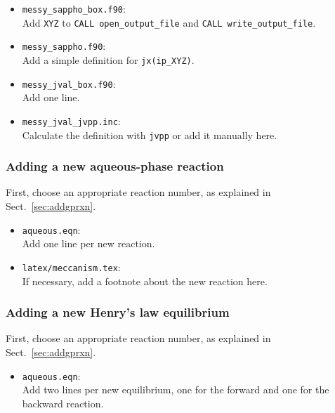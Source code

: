 \documentclass[twoside]{article}
\def\nosep{\setlength\parsep{0mm}\setlength\topsep{0mm}\setlength\itemsep{0mm}}
\begin{document}
\begin{itemize}\nosep
\item \verb|messy_sappho_box.f90|:\\
  Add \verb|XYZ| to \verb|CALL open_output_file| and
  \verb|CALL write_output_file|.
\item \verb|messy_sappho.f90|:\\
  Add a simple definition for \verb|jx(ip_XYZ)|.
\end{itemize}

\begin{itemize}\nosep
\item \verb|messy_jval_box.f90|:\\
  Add one line.
\item \verb|messy_jval_jvpp.inc|:\\
  Calculate the definition with \verb|jvpp| or add it manually here.
\end{itemize}

\subsubsection{Adding a new aqueous-phase reaction}

First, choose an appropriate reaction number, as explained in
Sect.~\ref{sec:addgprxn}.

\begin{itemize}\nosep
\item \verb|aqueous.eqn|:\\
  Add one line per new reaction.
\end{itemize}

\begin{itemize}\nosep
\item \verb|latex/meccanism.tex|:\\
  If necessary, add a footnote about the new reaction here.
\end{itemize}

\subsubsection{Adding a new Henry's law equilibrium}

First, choose an appropriate reaction number, as explained in
Sect.~\ref{sec:addgprxn}.

\begin{itemize}\nosep
\item \verb|aqueous.eqn|:\\
  Add two lines per new equilibrium, one for the forward and one for the
  backward reaction.
\end{itemize}
\end{document}
